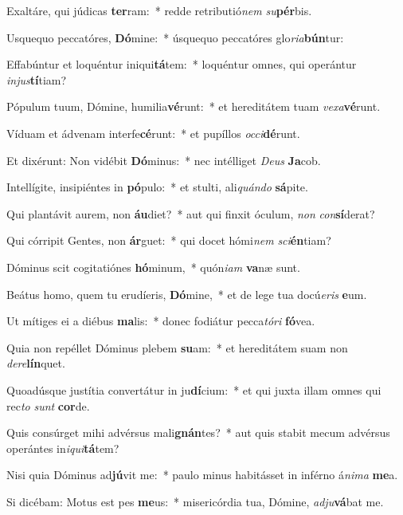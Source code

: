 \item Exaltáre, qui júdicas \textbf{ter}ram:~* redde retributió\textit{nem} \textit{su}\textbf{pér}bis.
\item Usquequo peccatóres, \textbf{Dó}mine:~* úsquequo peccatóres glo\textit{ri}\textit{a}\textbf{bún}tur:
\item Effabúntur et loquéntur iniqui\textbf{tá}tem:~* loquéntur omnes, qui operántur \textit{in}\textit{jus}\textbf{tí}tiam?
\item Pópulum tuum, Dómine, humilia\textbf{vé}runt:~* et hereditátem tuam \textit{ve}\textit{xa}\textbf{vé}runt.
\item Víduam et ádvenam interfe\textbf{cé}runt:~* et pupíllos \textit{oc}\textit{ci}\textbf{dé}runt.
\item Et dixérunt: Non vidébit \textbf{Dó}minus:~* nec intélliget \textit{De}\textit{us} \textbf{Ja}cob.
\item Intellígite, insipiéntes in \textbf{pó}pulo:~* et stulti, ali\textit{quán}\textit{do} \textbf{sá}pite.
\item Qui plantávit aurem, non \textbf{áu}diet?~* aut qui finxit óculum, \textit{non} \textit{con}\textbf{sí}derat?
\item Qui córripit Gentes, non \textbf{ár}guet:~* qui docet hómi\textit{nem} \textit{sci}\textbf{én}tiam?
\item Dóminus scit cogitatiónes \textbf{hó}minum,~* quón\textit{i}\textit{am} \textbf{va}næ sunt.
\item Beátus homo, quem tu erudíeris, \textbf{Dó}mine,~* et de lege tua docú\textit{e}\textit{ris} \textbf{e}um.
\item Ut mítiges ei a diébus \textbf{ma}lis:~* donec fodiátur pecca\textit{tó}\textit{ri} \textbf{fó}vea.
\item Quia non repéllet Dóminus plebem \textbf{su}am:~* et hereditátem suam non \textit{de}\textit{re}\textbf{lín}quet.
\item Quoadúsque justítia convertátur in ju\textbf{dí}cium:~* et qui juxta illam omnes qui rec\textit{to} \textit{sunt} \textbf{cor}de.
\item Quis consúrget mihi advérsus mali\textbf{gnán}tes?~* aut quis stabit mecum advérsus operántes in\textit{i}\textit{qui}\textbf{tá}tem?
\item Nisi quia Dóminus ad\textbf{jú}vit me:~* paulo minus habitásset in inférno á\textit{ni}\textit{ma} \textbf{me}a.
\item Si dicébam: Motus est pes \textbf{me}us:~* misericórdia tua, Dómine, \textit{ad}\textit{ju}\textbf{vá}bat me.
